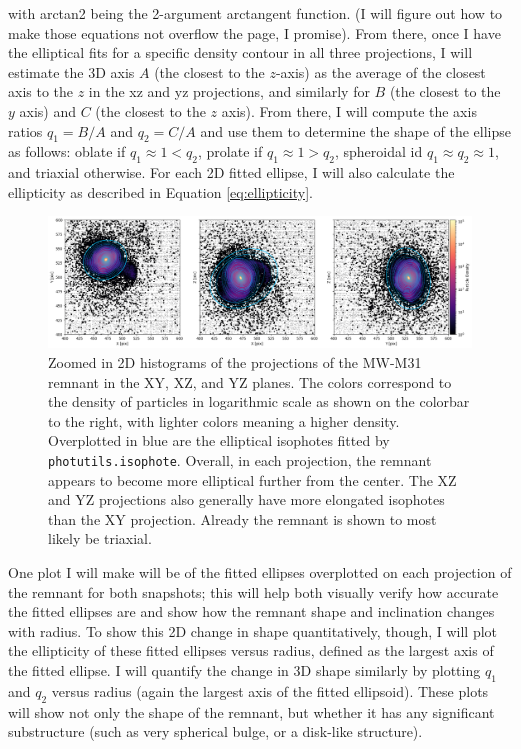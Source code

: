 \documentclass[twocolumn]{aastex631}
\begin{document}
with arctan2 being the 2-argument arctangent function. (I will figure out how to make those equations not overflow the page, I promise).
From there, once I have the elliptical fits for a specific density contour in all three projections, I will estimate the 3D axis $A$ (the closest to the $z$-axis) as the average of the closest axis to the $z$ in the xz and yz projections, and similarly for $B$ (the closest to the $y$ axis) and $C$ (the closest to the $z$ axis).
From there, I will compute the axis ratios $q_1 = B/A$ and $q_2 = C/A$ and use them to determine the shape of the ellipse as follows: oblate if $q_1 \approx 1 < q_2$, prolate if $q_1 \approx 1 > q_2$, spheroidal id $q_1 \approx q_2 \approx 1$, and triaxial otherwise.
For each 2D fitted ellipse, I will also calculate the ellipticity as described in Equation \ref{eq:ellipticity}.

\begin{figure}
    \centering
    \includegraphics[width=\linewidth]{ellipse_fits.png}
    \caption{Zoomed in 2D histograms of the projections of the MW-M31 remnant in the XY, XZ, and YZ planes. The colors correspond to the density of particles in logarithmic scale as shown on the colorbar to the right, with lighter colors meaning a higher density. Overplotted in blue are the elliptical isophotes fitted by \texttt{photutils.isophote}. Overall, in each projection, the remnant appears to become more elliptical further from the center. The XZ and YZ projections also generally have more elongated isophotes than the XY projection. Already the remnant is shown to most likely be triaxial.}
    \label{fig:ell_fits}
\end{figure}

One plot I will make will be of the fitted ellipses overplotted on each projection of the remnant for both snapshots; this will help both visually verify how accurate the fitted ellipses are and show how the remnant shape and inclination changes with radius. 
To show this 2D change in shape quantitatively, though, I will plot the ellipticity of these fitted ellipses versus radius, defined as the largest axis of the fitted ellipse.
I will quantify the change in 3D shape similarly by plotting $q_1$ and $q_2$ versus radius (again the largest axis of the fitted ellipsoid).
These plots will show not only the shape of the remnant, but whether it has any significant substructure (such as very spherical bulge, or a disk-like structure). 
\end{document}

